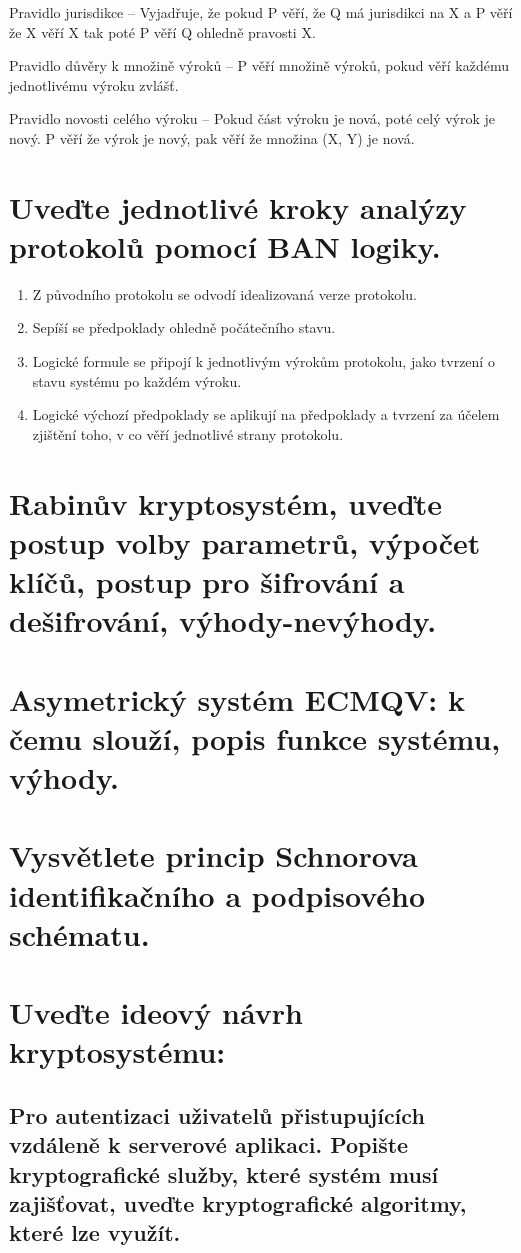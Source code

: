 Pravidlo jurisdikce -- Vyjadřuje, že pokud P věří, že Q má jurisdikci na X a P věří že X věří X tak poté P věří Q ohledně pravosti X.

Pravidlo důvěry k množině výroků -- P věří množině výroků, pokud věří každému jednotlivému výroku zvlášť.

Pravidlo novosti celého výroku -- Pokud část výroku je nová, poté celý výrok je nový. P věří že výrok je nový, pak věří že množina (X, Y) je nová.

\section{Uveďte jednotlivé kroky analýzy protokolů pomocí BAN logiky.}

\begin{enumerate}
    \item Z původního protokolu se odvodí idealizovaná verze protokolu.
    \item Sepíší se předpoklady ohledně počátečního stavu.
    \item Logické formule se připojí k jednotlivým výrokům protokolu, jako tvrzení o stavu systému po každém výroku.
    \item Logické výchozí předpoklady se aplikují na předpoklady a tvrzení za účelem zjištění toho, v co věří jednotlivé strany protokolu.
\end{enumerate}

\section{Rabinův kryptosystém, uveďte postup volby parametrů, výpočet klíčů, postup pro šifrování a dešifrování, výhody-nevýhody.}

\section{Asymetrický systém ECMQV: k čemu slouží, popis funkce systému, výhody.}

\section{Vysvětlete princip Schnorova identifikačního a podpisového schématu.}

\section{Uveďte ideový návrh kryptosystému:}
\subsection{Pro autentizaci uživatelů přistupujících vzdáleně k serverové aplikaci. Popište kryptografické služby, které systém musí zajišťovat, uveďte kryptografické algoritmy, které lze využít.}

